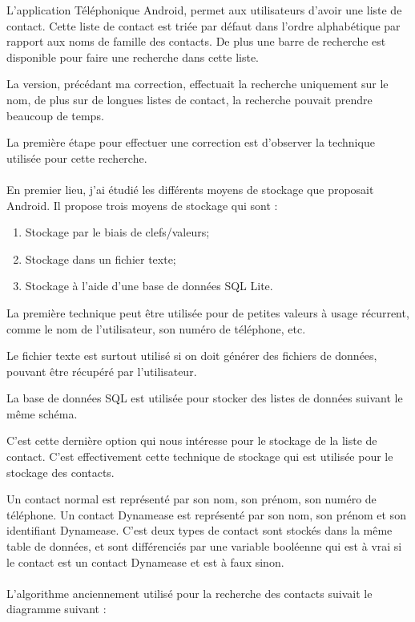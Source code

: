 L'application Téléphonique Android, permet aux utilisateurs d'avoir une liste de contact. Cette liste de contact est triée par défaut dans l'ordre alphabétique par rapport aux noms de famille des contacts. De plus une barre de recherche est disponible pour faire une recherche dans cette liste.

La version, précédant ma correction, effectuait la recherche uniquement sur le nom, de plus sur de longues listes de contact, la recherche pouvait prendre beaucoup de temps.

La première étape pour effectuer une correction est d'observer la technique utilisée pour cette recherche.\\\\

En premier lieu, j'ai étudié les différents moyens de stockage que proposait Android. Il propose trois moyens de stockage qui sont :

\begin{enumerate}
	\item Stockage par le biais de clefs/valeurs;
	\item Stockage dans un fichier texte;
	\item Stockage à l'aide d'une base de données SQL Lite.
\end{enumerate}

La première technique peut être utilisée pour de petites valeurs à usage récurrent, comme le nom de l'utilisateur, son numéro de téléphone, etc.

Le fichier texte est surtout utilisé si on doit générer des fichiers de données, pouvant être récupéré par l'utilisateur.

La base de données SQL est utilisée pour stocker des listes de données suivant le même schéma.

C'est cette dernière option qui nous intéresse pour le stockage de la liste de contact. C'est effectivement cette technique de stockage qui est utilisée pour le stockage des contacts.

Un contact normal est représenté par son nom, son prénom, son numéro de téléphone. Un contact Dynamease est représenté par son nom, son prénom et son identifiant Dynamease. C'est deux types de contact sont stockés dans la même table de données, et sont différenciés par une variable booléenne qui est à vrai si le contact est un contact Dynamease et est à faux sinon.\\\\

L'algorithme anciennement utilisé pour la recherche des contacts suivait le diagramme suivant :

